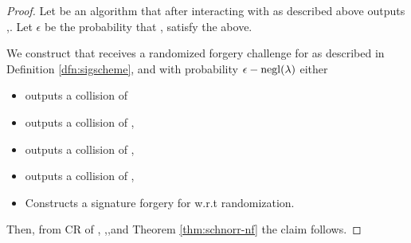 \documentclass[11pt]{article}
\numberwithin{equation}{section} %
\numberwithin{figure}{section} %
\newcommand{\eps}{\ensuremath{\epsilon}\xspace}
\begin{document}
\begin{proof}
Let \adv be an algorithm that after interacting with \oracle as described above outputs \ledger,\tx.
Let \eps be the probability that \ledger, \tx satisfy the above.

We construct \advprime that receives a randomized forgery challenge for \schnorr as described in Definition \ref{dfn:sigscheme},
and with probability $\eps-\negl$ either
\begin{itemize}
\item outputs a collision of \sighash
\item outputs a collision of \NF, 
 \item outputs a collision of \notecom, 
 \item outputs a collision of \IVK, 
\item  Constructs a signature forgery for \schnorr w.r.t randomization.
\end{itemize}


Then, from CR of \sighash, \NF,\notecom,\IVK and Theorem \ref{thm:schnorr-nf} the claim follows.


\end{proof}
\end{document}
